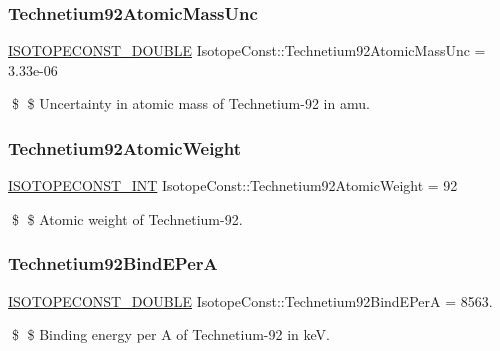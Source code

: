 \subsubsection{\texorpdfstring{Technetium92\+Atomic\+Mass\+Unc}{Technetium92AtomicMassUnc}}
{\footnotesize\ttfamily \mbox{\hyperlink{group___isotope_const-_macros_ga8f45a7272ce02c0b4c65c44636ed719a}{I\+S\+O\+T\+O\+P\+E\+C\+O\+N\+S\+T\+\_\+\+D\+O\+U\+B\+LE}} Isotope\+Const\+::\+Technetium92\+Atomic\+Mass\+Unc = 3.\+33e-\/06}

\$ \$ Uncertainty in atomic mass of Technetium-\/92 in amu. \mbox{\label{group___isotope_const-_technetium-_tc92_ga519e6b94b131e93e29e00fc009f4e2f3}} 
\subsubsection{\texorpdfstring{Technetium92\+Atomic\+Weight}{Technetium92AtomicWeight}}
{\footnotesize\ttfamily \mbox{\hyperlink{group___isotope_const-_macros_ga5f18360b3e99483a35c32d789e62621c}{I\+S\+O\+T\+O\+P\+E\+C\+O\+N\+S\+T\+\_\+\+I\+NT}} Isotope\+Const\+::\+Technetium92\+Atomic\+Weight = 92}

\$ \$ Atomic weight of Technetium-\/92. \mbox{\label{group___isotope_const-_technetium-_tc92_ga3196859fd9f5e688224edbb128427cc2}} 
\subsubsection{\texorpdfstring{Technetium92\+Bind\+E\+PerA}{Technetium92BindEPerA}}
{\footnotesize\ttfamily \mbox{\hyperlink{group___isotope_const-_macros_ga8f45a7272ce02c0b4c65c44636ed719a}{I\+S\+O\+T\+O\+P\+E\+C\+O\+N\+S\+T\+\_\+\+D\+O\+U\+B\+LE}} Isotope\+Const\+::\+Technetium92\+Bind\+E\+PerA = 8563.}

\$ \$ Binding energy per A of Technetium-\/92 in keV. \mbox{\label{group___isotope_const-_technetium-_tc92_ga012e3580eb680e157d3424c79e01028e}} 
